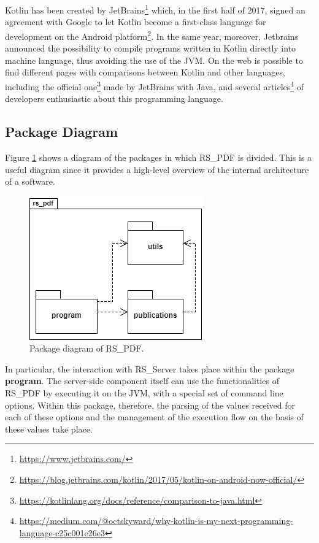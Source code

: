 \documentclass[a4paper, english]{article}
\begin{document}
Kotlin has been created by JetBrains\footnote{\url{https://www.jetbrains.com/}} which, in the first half of 2017, signed an agreement with Google to let Kotlin become a first-class language for development on the Android platform\footnote{\url{https://blog.jetbrains.com/kotlin/2017/05/kotlin-on-android-now-official/}}. In the same year, moreover, Jetbrains announced the possibility to compile programs written in Kotlin directly into machine language, thus avoiding the use of the JVM. On the web is possible to find different pages with comparisons between Kotlin and other languages, including the official one\footnote{\url{https://kotlinlang.org/docs/reference/comparison-to-java.html}} made by JetBrains with Java, and several articles\footnote{\url{https://medium.com/@octskyward/why-kotlin-is-my-next-programming-language-c25c001e26e3}} of developers enthusiastic about this programming language.

\subsection{Package Diagram}

Figure \ref{fig:package} shows a diagram of the packages in which RS\_PDF is divided. This is a useful diagram since it provides a high-level overview of the internal architecture of a software.

\begin{figure}[!tbp]
\centering
\includegraphics[scale=0.7]{figures/package.png}
\caption{Package diagram of RS\_PDF.}
\label{fig:package}
\end{figure}

In particular, the interaction with RS\_Server takes place within the package \textbf{program}. The server-side component itself can use the functionalities of RS\_PDF by executing it on the JVM, with a special set of command line options. Within this package, therefore, the parsing of the values received for each of these options and the management of the execution flow on the basis of these values take place.
\end{document}
